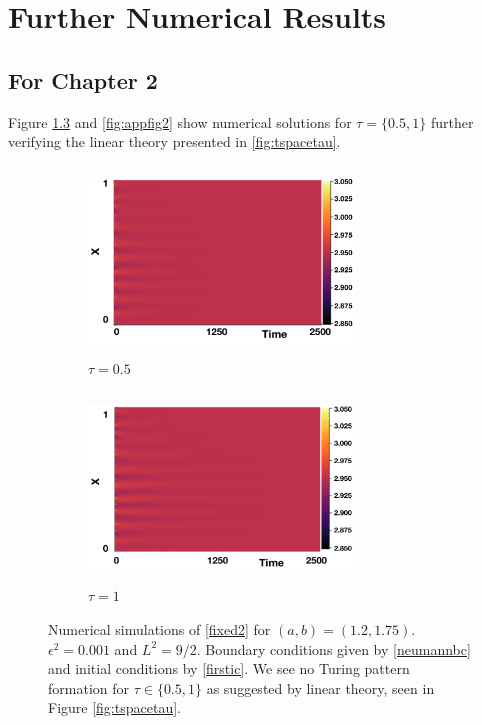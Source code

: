 \chapter{Further Numerical Results}\label{section:appB}

\section{For Chapter 2}\label{section:Bfix}

Figure \ref{fig:appfig1} and \ref{fig:appfig2} show numerical solutions for $\tau=\{0.5,1\}$ further verifying the linear theory presented in \ref{fig:tspacetau}.

\begin{figure}[H]
  \centering
\begin{subfigure}[t]{0.45\textwidth}
    \centering
    \includegraphics[width=7cm,height=5cm]{p3t05.png}
    \caption{$\tau=0.5$}
    \label{}
\end{subfigure}
\hfill
\begin{subfigure}[t]{0.45\textwidth}
    \centering
    \includegraphics[width=7cm,height=5cm]{p3t1.png}
    \caption{$\tau=1$}
    \label{}
\end{subfigure}
\caption{Numerical simulations of \eqref{fixed2} for $(a,b)=(1.2,1.75)$. $\epsilon^2=0.001$ and $L^2=9/2$. Boundary conditions given by \eqref{neumannbc} and initial conditions by \eqref{firstic}. We see no Turing pattern formation for $\tau\in\{0.5,1\}$ as suggested by linear theory, seen in Figure \ref{fig:tspacetau}. }
\label{fig:appfig1}
\end{figure}
